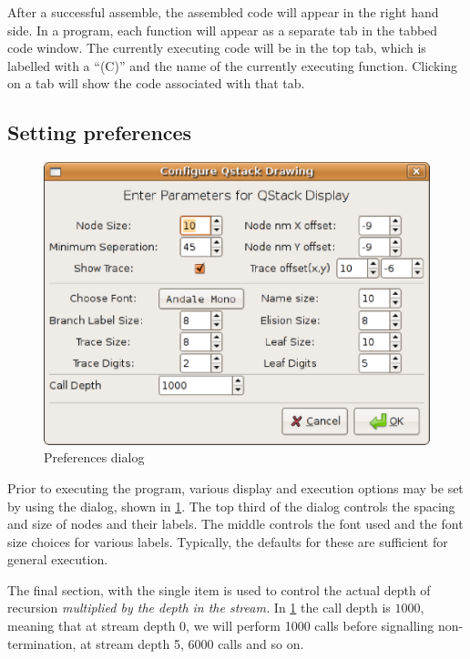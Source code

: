 After a successful assemble, the assembled code will appear in the right
hand side. In a program, each function will appear as a separate tab in the
tabbed code window. The currently executing code will be in the top tab,
which is labelled with a ``(C)'' and the name of the currently executing
function. Clicking on a tab will show the code associated with that tab.

\subsection{Setting preferences}

\begin{figure}[htbp]
\centering
\includegraphics[scale=.5]{images/emulator/ConfigureQstackDisplay.eps}
\caption{Preferences dialog}\label{fig:emconfigure}
\end{figure}

Prior to executing the program, various display and execution options may
be set by using the  dialog, shown in
\ref{fig:emconfigure}. The top third of the dialog controls the spacing and
size of nodes and their labels. The middle controls the font used and the
font size choices for various labels.  Typically, the defaults for these
are sufficient for general execution.

The final section, with the single item  is used
to control the actual depth of recursion \emph{multiplied by the depth in
the stream.} In \ref{fig:emconfigure} the call depth is $1000$, meaning
that at stream depth 0, we will perform 1000 calls before
signalling non-termination, at stream depth 5, 6000 calls and so on.


